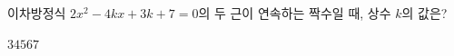 이차방정식 $2x^2-4kx+3k+7=0$의 두 근이 연속하는 짝수일 때, 상수 $k$의 값은?
\begin{choices32}{$3$}{$4$}{$5$}{$6$}{$7$}\end{choices32}
